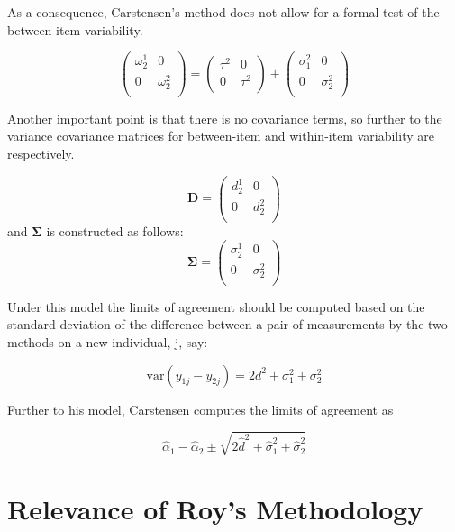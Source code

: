 \documentclass[12pt, a4paper]{report}
\theoremstyle{plain}
\theoremstyle{definition}
\theoremstyle{remark}
\begin{document}
As a consequence, Carstensen's method does not allow for a formal test of the between-item variability.


\[\left(\begin{array}{cc}
\omega^1_2  & 0 \\
0 & \omega^2_2 \\
\end{array}  \right)
=  \left(
\begin{array}{cc}
\tau^2  & 0 \\
0 & \tau^2 \\
\end{array} \right)+
\left(
\begin{array}{cc}
\sigma^2_1  & 0 \\
0 & \sigma^2_2 \\
\end{array}\right)
\]





Another important point is that there is no covariance terms, so
further to  \citet{BXC2008} the variance covariance matrices for
between-item and within-item variability are respectively.

\[\boldsymbol{D} = \left(
\begin{array}{cc}
d^1_2  & 0 \\
0 & d^2_2 \\
\end{array}
\right) \]
and  $\boldsymbol{\Sigma}$ is constructed as follows:
\[\boldsymbol{\Sigma} = \left(
\begin{array}{cc}
\sigma^1_2  & 0 \\
0 & \sigma^2_2 \\
\end{array}
\right) \]


Under this model the limits of agreement should be computed based
on the standard deviation of the difference between a pair of
measurements by the two methods on a new individual, j, say:

\[ \mbox{var}(y_{1j} - y_{2j}) = 2d^2 + \sigma^2_1 + \sigma^2_2  \]

Further to his model, Carstensen computes the limits of agreement
as

\[
\hat{\alpha}_1 - \hat{\alpha}_2 \pm \sqrt{2 \hat{d}^2 + 	\hat{\sigma}^2_1 + \hat{\sigma}^2_2}
\]



	\section{Relevance of Roy's Methodology}
\end{document}
